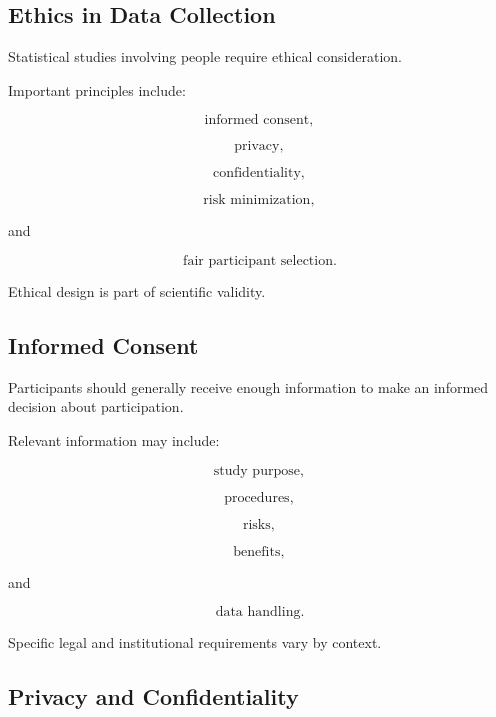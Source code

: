 \subsection{Ethics in Data Collection}
\label{subsec:ethics-data-collection}

Statistical studies involving people require ethical consideration.

Important principles include:

\[
\boxed{
\text{informed consent},
}
\]

\[
\boxed{
\text{privacy},
}
\]

\[
\boxed{
\text{confidentiality},
}
\]

\[
\boxed{
\text{risk minimization},
}
\]

and

\[
\boxed{
\text{fair participant selection}.
}
\]

Ethical design is part of scientific validity.

\subsection{Informed Consent}
\label{subsec:informed-consent}

Participants should generally receive enough information to make an
informed decision about participation.

Relevant information may include:

\[
\text{study purpose},
\]

\[
\text{procedures},
\]

\[
\text{risks},
\]

\[
\text{benefits},
\]

and

\[
\text{data handling}.
\]

Specific legal and institutional requirements vary by context.

\subsection{Privacy and Confidentiality}
\label{subsec:privacy-confidentiality}

